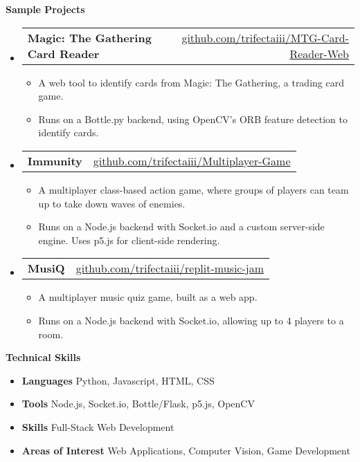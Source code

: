 \documentclass[letterpaper,12pt]{article}[leftmargin=*]
\makeatletter
\def \entryspacing {-0pt}
\renewcommand{\section}[2]{\vspace{5pt}
  \colorbox{secondary}{\color{white}\raggedbottom\normalsize\textbf{{#1}{\hspace{7pt}#2}}}
}
\newcommand{\resumeEntryStart}{\begin{itemize}[leftmargin=2.5mm]}
\newcommand{\resumeEntryEnd}{\end{itemize}\vspace{\entryspacing}}
\newcommand{\resumeItemListStart}{\begin{itemize}[leftmargin=4.5mm]}
\newcommand{\resumeItemListEnd}{\end{itemize}}
\newcommand{\resumeItem}[1]{
  \item{%
    {#1 \vspace{-2pt}}
  }
}
\newcommand{\resumeEntryTD}[2]{
  \vspace{-1pt}\item[]
    \begin{tabular*}{0.97\textwidth}{l@{\extracolsep{\fill}}r}
      \textbf{\color{primary}#1} & {\firabook\color{accent}\small#2} \\
    \end{tabular*}\vspace{-6pt}
}
\newcommand{\resumeEntryS}[2]{
  \item[]\small{
    \textbf{\color{primary}#1 }{ #2 \vspace{-6pt}}
  }
}
\makeatother
\begin{document}
\section{\faFlask}{Sample Projects}

  \resumeEntryStart
    \resumeEntryTD
      {Magic: The Gathering Card Reader}{\href{https://github.com/trifectaiii/MTG-Card-Reader-Web}{github.com/trifectaiii/MTG-Card-Reader-Web}}
    \resumeItemListStart
      \resumeItem {A web tool to identify cards from Magic: The Gathering, a trading card game.}
      \resumeItem {Runs on a Bottle.py backend, using OpenCV's ORB feature detection to identify cards.}
    \resumeItemListEnd
  \resumeEntryEnd
  
  \resumeEntryStart
    \resumeEntryTD
      {Immunity}{\href{https://github.com/trifectaiii/Multiplayer-Game}{github.com/trifectaiii/Multiplayer-Game}}
    \resumeItemListStart
      \resumeItem {A multiplayer class-based action game, where groups of players can team up to take down waves of enemies.}
      \resumeItem {Runs on a Node.js backend with Socket.io and a custom server-side engine. Uses p5.js for client-side rendering.}
    \resumeItemListEnd
  \resumeEntryEnd

  \resumeEntryStart
    \resumeEntryTD
      {MusiQ}{\href{https://github.com/TrifectaIII/replit-music-jam}{github.com/trifectaiii/replit-music-jam}}
    \resumeItemListStart
      \resumeItem {A multiplayer music quiz game, built as a web app.}
      \resumeItem {Runs on a Node.js backend with Socket.io, allowing up to 4 players to a room.}
    \resumeItemListEnd
  \resumeEntryEnd

\section{\faGears}{Technical Skills}
 \resumeEntryStart
  \resumeEntryS{Languages } {Python, Javascript, HTML, CSS}
  \resumeEntryS{Tools } {Node.js, Socket.io, Bottle/Flask, p5.js, OpenCV}
  \resumeEntryS{Skills } {Full-Stack Web Development}
  \resumeEntryS{Areas of Interest } {Web Applications, Computer Vision, Game Development}
 \resumeEntryEnd
 
\begin{center}
\begin{scriptsize}
\end{scriptsize}
\end{center}
\end{document}
